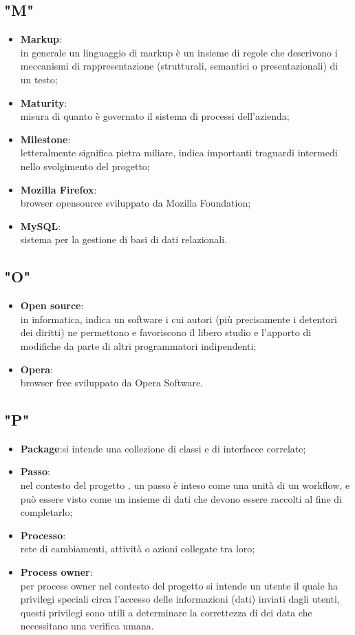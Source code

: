 \subsection{"M"}
\begin{itemize}
\item \textbf{Markup}:\\ in generale un linguaggio di markup è un insieme di regole che descrivono i meccanismi di rappresentazione (strutturali, semantici o presentazionali) di un testo;
\item \textbf{Maturity}:\\ misura di quanto è governato il sistema di processi dell'azienda;
\item \textbf{Milestone}:\\ letteralmente significa pietra miliare, indica importanti traguardi intermedi nello svolgimento del progetto;
\item \textbf{Mozilla Firefox}:\\ browser opensource sviluppato da Mozilla Foundation;
\item \textbf{MySQL}:\\ sistema per la gestione di basi di dati relazionali.
\end{itemize}

\subsection{"O"}
\begin{itemize}
\item \textbf{Open source}:\\ in informatica, indica un software i cui autori (più precisamente i detentori dei diritti) ne permettono e favoriscono il libero studio e l'apporto di modifiche da parte di altri programmatori indipendenti;
\item \textbf{Opera}:\\ browser free sviluppato da Opera Software.
\end{itemize}

\subsection{"P"}
\begin{itemize}
\item \textbf{Package}:si intende una collezione di classi e di interfacce correlate;
\item \textbf{Passo}:\\ nel contesto del progetto \progetto{}, un passo è inteso come una unità di un workflow, e può essere visto come un insieme di dati che devono essere raccolti al fine di completarlo;
\item \textbf{Processo}:\\ rete di cambiamenti, attività o azioni collegate tra loro;
\item \textbf{Process owner}:\\ per process owner nel contesto del progetto si intende un utente il quale ha privilegi speciali circa l'accesso delle informazioni (dati) inviati dagli utenti, questi privilegi sono utili a determinare la correttezza di dei data che necessitano una verifica umana.
\end{itemize}
